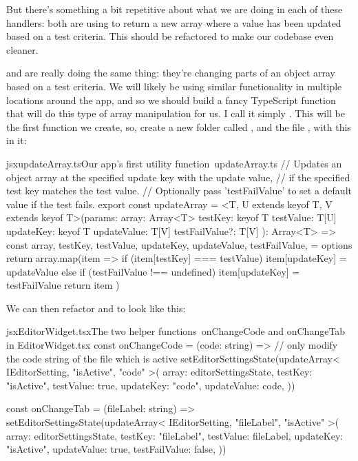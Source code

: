 \documentclass[a4paper,headinclude=on,footinclude=on,12pt,oneside]{scrbook}
\begin{document}
But there's something a bit repetitive about what we are doing in each of these handlers: both are using  to return a new array where a value has been updated based on a test criteria. This should be refactored to make our codebase even cleaner.


 and  are really doing the same thing: they're changing parts of an object array based on a test criteria. We will likely be using similar functionality in multiple locations around the app, and so we should build a fancy TypeScript function that will do this type of array manipulation for us. I call it simply . This will be the first  function we create, so, create a new folder called , and the file , with this in it:

\begin{codeInput}{jsx}{updateArray.ts}{Our app's first utility function\, updateArray.ts}
// Updates an object array at the specified update key with the update value,
// if the specified test key matches the test value.
// Optionally pass 'testFailValue' to set a default value if the test fails.
export const updateArray = <T, U extends keyof T, V extends keyof T>(params: {
  array: Array<T>
  testKey: keyof T
  testValue: T[U]
  updateKey: keyof T
  updateValue: T[V]
  testFailValue?: T[V]
}): Array<T> => {
  const {
    array,
    testKey,
    testValue,
    updateKey,
    updateValue,
    testFailValue,
  } = options
  return array.map(item => {
    if (item[testKey] === testValue) {
      item[updateKey] = updateValue
    } else if (testFailValue !== undefined) {
      item[updateKey] = testFailValue
    }
    return item
  })
}
\end{codeInput}

We can then refactor  and  to look like this:

\begin{codeInput}{jsx}{EditorWidget.tsx}{The two helper functions\, onChangeCode and onChangeTab in EditorWidget.tsx}
const onChangeCode = (code: string) => {
  // only modify the code string of the file which is active
  setEditorSettingsState(updateArray<
    IEditorSetting,
    "isActive",
    "code"
  >({
    array: editorSettingsState,
    testKey: "isActive",
    testValue: true,
    updateKey: "code",
    updateValue: code,
  }))
}

const onChangeTab = (fileLabel: string) => {
  setEditorSettingsState(updateArray<
    IEditorSetting,
    "fileLabel",
    "isActive"
  >({
    array: editorSettingsState,
    testKey: "fileLabel",
    testValue: fileLabel,
    updateKey: "isActive",
    updateValue: true,
    testFailValue: false,
  }))
}
\end{codeInput}
\end{document}
